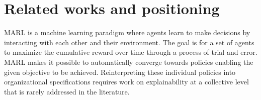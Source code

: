 \documentclass[runningheads]{llncs}
\begin{document}
\section{Related works and positioning}



MARL is a machine learning paradigm where agents learn to make decisions by interacting with each other and their environment. The goal is for a set of agents to maximize the cumulative reward over time through a process of trial and error.
MARL makes it possible to automatically converge towards policies enabling the given objective to be achieved. Reinterpreting these individual policies into organizational specifications requires work on explainability at a collective level that is rarely addressed in the literature.











\end{document}
